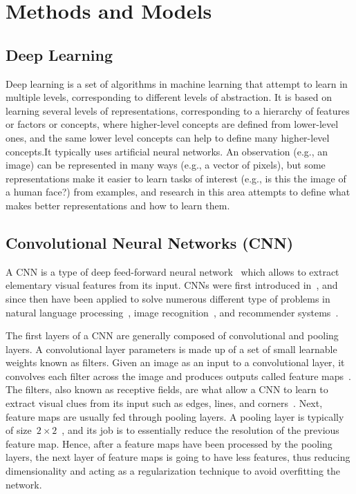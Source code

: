 \section{Methods and Models}

\subsection{Deep Learning}
Deep learning is a set of algorithms in machine learning that attempt to learn in multiple levels, corresponding to different levels of abstraction. It is based on learning several levels of representations, corresponding to a hierarchy of features or factors or concepts, where higher-level concepts are defined from lower-level ones, and the same lower level concepts can help to define many higher-level concepts.It typically uses artificial neural networks. An observation (e.g., an image) can be represented in many ways (e.g., a vector of pixels), but some representations make it easier to learn tasks of interest (e.g., is this the image of a human face?) from examples, and research in this area attempts to define what makes better representations and how to learn them\cite{DeepLearning}.

\subsection{Convolutional Neural Networks (CNN)}

A CNN is a type of deep feed-forward neural network~\cite{cnn-star-galaxy} which allows to extract elementary visual features from its input. CNNs were first introduced in~\cite{Lecun99objectrecognition}, and since then have been applied to solve numerous different type of problems in  natural language processing~\cite{Collobert:2008:UAN:1390156.1390177}, image recognition~\cite{cnn-star-galaxy}, and recommender systems~\cite{NIPS2013_5004}.

The first layers of a CNN are generally composed of convolutional and pooling layers. A convolutional layer parameters is made up of a set of small learnable weights known as filters. Given an image as an input to a convolutional layer, it convolves each filter across the image and produces outputs called feature maps~\cite{cnn-star-galaxy}. The filters, also known as receptive fields, are what allow a CNN to learn to extract visual clues from its input such as edges, lines, and corners~\cite{Lecun99objectrecognition}. Next, feature maps are usually fed through pooling layers. A pooling layer is typically of size~$2 \times 2$~\cite{NIPS2012_4824}, and  its job is to essentially reduce the resolution of the previous feature map. Hence, after a feature maps have been processed by the pooling layers, the next layer of feature maps is going to have less features, thus reducing dimensionality and acting as a regularization technique to avoid overfitting the network.


